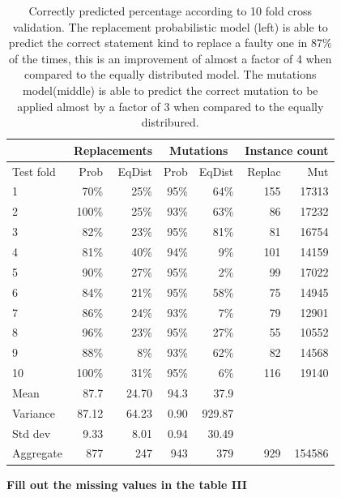 \documentclass[conference]{IEEEtran}
\newcommand{\todo}[1]
  {{\scriptsize \textbf{\color{red} {#1}}}}
\begin{document}
\begin{table}[ht]
\begin{tabular}{l|rr|rr|rr}
   &\multicolumn{2}{c|}{Replacements} &\multicolumn{2}{c|}{Mutations}&\multicolumn{2}{c}{Instance count} \\
   	\hline
Test fold	&Prob&	EqDist&Prob&	EqDist & Replac  & Mut\\
	\hline
1	&70\%&	25\% &  95\% & 64\% & 155 &17313 \\
2	&100\%&	25\%  & 93\% & 63\% & 86 & 17232 \\
3	&82\%	&23\% & 95\% & 81\% & 81 & 16754\\
4	&81\%	&40\%  & 94\% & 9\% & 101 & 14159 \\
5	&90\%	&27\%  & 95\% & 2\%& 99 & 17022 \\
6	&84\%	&21\%  & 95\%& 58\%& 75 & 14945 \\
7	&86\%	&24\%  & 93\%& 7\%& 79 & 12901 \\
8	&96\%	&23\%  & 95\%& 27\%& 55 & 10552 \\
9	&88\%	&8\%  & 93\%& 62\%& 82 & 14568\\
10	&100\%	&31\%  & 95\% & 6\%& 116 & 19140\\
	\hline
Mean	&87.7	&24.70  & 94.3 & 37.9 & \\
	\hline
Variance	&87.12&	64.23  & 0.90 & 929.87 & \\
	\hline
Std dev	&9.33&	8.01  & 0.94 & 30.49 & \\
	\hline
Aggregate& 877 & 247 & 943 & 379 & 929 &  154586\\


\hline
\end{tabular}
\center
  \caption{Correctly predicted percentage according to 10 fold cross
    validation. The replacement probabilistic model (left) is able to predict
    the correct statement kind to replace a faulty one in 87\% of the times,
    this is an improvement of almost a factor of 4 when compared to the equally
    distributed model. The mutations model(middle) is able to predict the
    correct mutation to be applied almost by a factor of 3 when compared to the
    equally distribured.} 
  \label{tab:results10fcv}
\end{table} 

\todo{Fill out the missing values in the table III}
\end{document}
